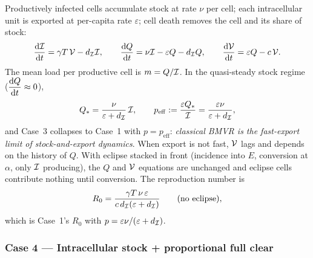 Productively infected cells accumulate stock at rate $\nu$ per cell; each
intracellular unit is exported at per-capita rate $\varepsilon$; cell death
removes the cell and its share of stock:
\begin{equation}
\displaystyle\frac{{\rm d} \mathcal{I}}{{\rm d} t}=\gamma T\,\mathcal{V}-d_{\mathcal{I}}\mathcal{I},
\qquad
\displaystyle\frac{{\rm d} Q}{{\rm d} t}=\nu\mathcal{I}-\varepsilon Q-d_{\mathcal{I}}Q,
\qquad
\displaystyle\frac{{\rm d} \mathcal{V}}{{\rm d} t}=\varepsilon Q-c\,\mathcal{V}.
\end{equation}
The mean load per productive cell is $m=Q/\mathcal{I}$. In the quasi-steady
stock regime ($\displaystyle\frac{{\rm d} Q}{{\rm d} t}\approx0$),
\begin{equation}
Q_*=\frac{\nu}{\varepsilon+d_{\mathcal{I}}}\,\mathcal{I},
\qquad
p_{\mathrm{eff}}:=\frac{\varepsilon Q_*}{\mathcal{I}}
=\frac{\varepsilon\nu}{\varepsilon+d_{\mathcal{I}}},
\end{equation}
and Case~3 collapses to Case~1 with $p=p_{\mathrm{eff}}$: \emph{classical
BMVR is the fast-export limit of stock-and-export dynamics}. When export is
not fast, $\mathcal{V}$ lags and depends on the history of $Q$. With eclipse
stacked in front (incidence into $E$, conversion at $\alpha$, only $\mathcal{I}$
producing), the $Q$ and $\mathcal{V}$ equations are unchanged and eclipse cells
contribute nothing until conversion. The reproduction number is
\begin{equation}
R_0=\frac{\gamma T\,\nu\,\varepsilon}{c\,d_{\mathcal{I}}(\varepsilon+d_{\mathcal{I}})}
\qquad\text{(no eclipse)},
\end{equation}
which is Case~1's $R_0$ with $p=\varepsilon\nu/(\varepsilon+d_{\mathcal{I}})$.

\subsubsection{Case 4 --- Intracellular stock + proportional full clear}

